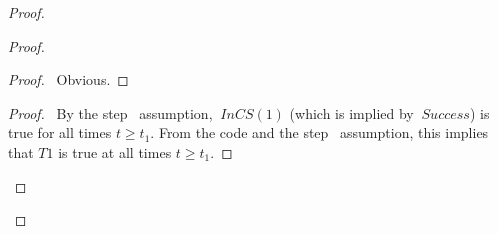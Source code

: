 \documentclass[fleqn,leqno]{article}
\begin{document}
\begin{proof}
% 
% 
% 


\begin{proof}
  \begin{proof}
  \pf\ Obvious.
  \end{proof}
  \begin{proof}
     \pf\ By the step~ assumption, $~InCS(1)$ 
     (which is implied by \linebreak $~Success$) is true
     for all times $t\geq t_{1}$.  From the code and the
     step~ assumption, this implies that
     $T1$ is true at all times $t\geq t_{1}$.
  \end{proof}


\end{proof}
\end{proof}
\end{document}
